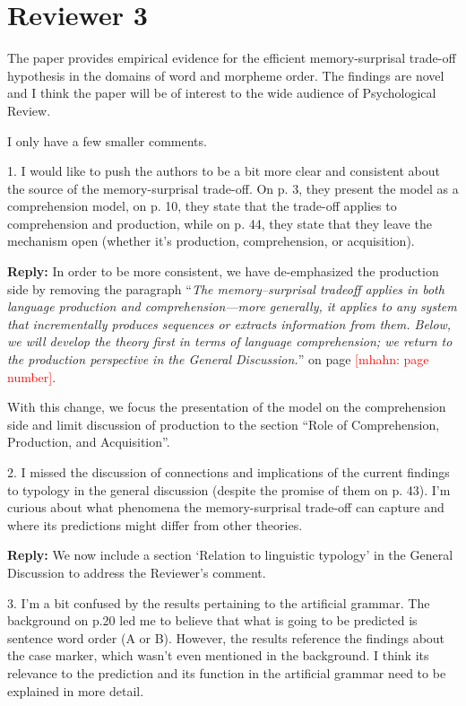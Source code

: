 \documentclass{article}[11pt,a4paper,oneside]
\newcommand\mhahn[1]{\textcolor{red}{[mhahn: #1]}}
\newcommand\jd[1]{\textcolor{teal}{[jd: #1]}}
\newenvironment{reply}
  {\par\medskip
   \color{blue}%
   \begin{framed}
   \textbf{Reply: }\ignorespaces}
 {\end{framed}
  \medskip}
\begin{document}
\section{Reviewer 3}

The paper provides empirical evidence for the efficient memory-surprisal trade-off hypothesis in the domains of word and morpheme order. The findings are novel and I think the paper will be of interest to the wide audience of Psychological Review.

I only have a few smaller comments.

1. I would like to push the authors to be a bit more clear and consistent about the source of the memory-surprisal trade-off. On p. 3, they present the model as a comprehension model, on p. 10, they state that the trade-off applies to comprehension and production, while on p. 44, they state that they leave the mechanism open (whether it's production, comprehension, or acquisition).

\begin{reply}
	In order to be more consistent, we have de-emphasized the production side by removing the paragraph ``\textit{The memory--surprisal tradeoff applies in both language production and comprehension---more generally, it applies to any system that incrementally produces sequences or extracts information from them. Below, we will develop the theory first in terms of language comprehension; we return to the production perspective in the General Discussion.}'' on page \mhahn{page number}.

	With this change, we focus the presentation of the model on the comprehension side and limit discussion of production to the section ``Role of Comprehension, Production, and Acquisition''.
\end{reply}

2. I missed the discussion of connections and implications of the current findings to typology in the general discussion (despite the promise of them on p. 43). I'm curious about what phenomena the memory-surprisal trade-off can capture and where its predictions might differ from other theories.

\begin{reply}
	We now include a section `Relation to linguistic typology' in the General Discussion to address the Reviewer's comment. %
\end{reply}

3. I'm a bit confused by the results pertaining to the artificial grammar. The background on p.20 led me to believe that what is going to be predicted is sentence word order (A or B). However, the results reference the findings about the case marker, which wasn't even mentioned in the background. I think its relevance to the prediction and its function in the artificial grammar need to be explained in more detail.
\end{document}

